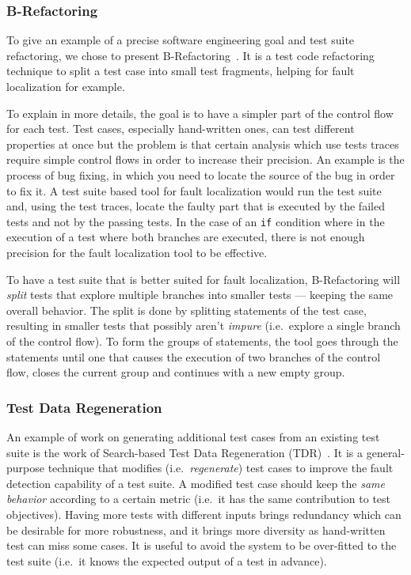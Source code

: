 \documentclass[11pt]{sdm}
\begin{document}
\subsubsection{B-Refactoring}
\label{brefactoring}
To give an example of a precise software engineering goal and test suite refactoring, we chose to present B-Refactoring~\cite{xuan2016b}.
It is a test code refactoring technique to split a test case into small test fragments, helping for fault localization for example.

To explain in more details, the goal is to have a simpler part of the control flow for each test.
Test cases, especially hand-written ones, can test different properties at once but the problem is that certain analysis which use tests traces require simple control flows in order to increase their precision.
An example is the process of bug fixing, in which you need to locate the source of the bug in order to fix it.
A test suite based tool for fault localization would run the test suite and, using the test traces, locate the faulty part that is executed by the failed tests and not by the passing tests.
In the case of an \texttt{if} condition where in the execution of a test where both branches are executed, there is not enough precision for the fault localization tool to be effective.

To have a test suite that is better suited for fault localization, B-Refactoring will \textit{split} tests that explore multiple branches into smaller tests --- keeping the same overall behavior.
The split is done by splitting statements of the test case, resulting in smaller tests that possibly aren't \textit{impure} (i.e.\ explore a single branch of the control flow).
To form the groups of statements, the tool goes through the statements until one that causes the execution of two branches of the control flow, closes the current group and continues with a new empty group.

\subsubsection{Test Data Regeneration}
\label{tdr}
An example of work on generating additional test cases from an existing test suite is the work of Search-based Test Data Regeneration (TDR)~\cite{yoo2012test}.
It is a general-purpose technique that modifies (i.e.\ \emph{regenerate}) test cases to improve the fault detection capability of a test suite.
A modified test case should keep the \emph{same behavior} according to a certain metric (i.e.\ it has the same contribution to test objectives).
Having more tests with different inputs brings redundancy which can be desirable for more robustness, and it brings more diversity as hand-written test can miss some cases.
It is useful to avoid the system to be over-fitted to the test suite (i.e.\ it knows the expected output of a test in advance).
\end{document}
